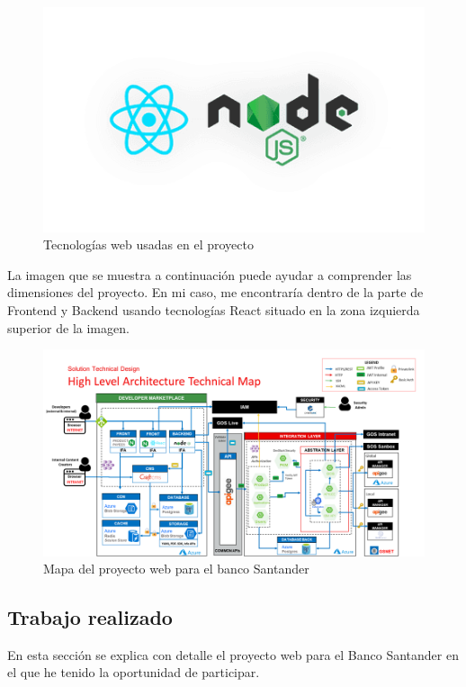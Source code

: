 \documentclass[a4paper,12pt]{article}
\begin{document}
\begin{itemize}
\begin{figure}[H]
\centering
\includegraphics[scale=0.7]{react-node.png}
\caption{Tecnologías web usadas en el proyecto}
\end{figure}

La imagen que se muestra a continuación puede ayudar a comprender las dimensiones del proyecto. En mi caso, me encontraría dentro de la parte de Frontend y Backend usando tecnologías React situado en la zona izquierda superior de la imagen.

\begin{figure}[H]
\centering
\includegraphics[scale=0.4]{mapa.png}
\caption{Mapa del proyecto web para el banco Santander}
\end{figure}

\end{itemize}

\subsection{Trabajo realizado}

En esta sección se explica con detalle el proyecto web para el Banco Santander en el que he tenido la oportunidad de participar.
\end{document}
